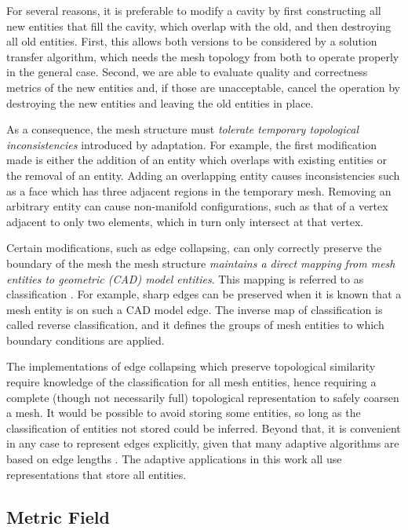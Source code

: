 For several reasons, it is preferable to modify a cavity
by first constructing all new entities that fill the cavity,
which overlap with the old, and then destroying all old entities.
First, this allows both versions to be considered by a solution
transfer algorithm, which needs the mesh topology from both
to operate properly in the general case.
Second, we are able to evaluate quality and correctness metrics
of the new entities and, if those are unacceptable, cancel the
operation by destroying the new entities and leaving
the old entities in place.

As a consequence, the mesh structure must \emph{tolerate temporary
topological inconsistencies} introduced by adaptation.
For example, the first modification made is either the addition
of an entity which overlaps with existing entities
or the removal of an entity.
Adding an overlapping entity causes inconsistencies such as
a face which has three adjacent regions in the temporary mesh.
Removing an arbitrary entity can cause non-manifold configurations,
such as that of a vertex adjacent to only two elements, which
in turn only intersect at that vertex.

Certain modifications, such as edge collapsing, can only correctly
preserve the boundary of the mesh the mesh structure \emph{maintains
a direct mapping from mesh entities to geometric (CAD) model
entities}.
This mapping is referred to as classification \cite{schroeder1990combined}.
For example, sharp edges
can be preserved when it is known that a mesh entity is
on such a CAD model edge.
The inverse map of classification is called reverse
classification, and it defines the groups of mesh entities
to which boundary conditions are applied.

The implementations of edge collapsing which preserve
topological similarity require knowledge
of the classification for all mesh entities,
hence requiring a complete (though not necessarily full)
topological representation \cite{seol2006efficient}
to safely coarsen a mesh.
It would be possible to avoid storing some entities, so long
as the classification of entities not stored could be inferred.
Beyond that, it is convenient in any case to represent
edges explicitly, given that many adaptive algorithms
are based on edge lengths \cite{biswas1998tetrahedral}.
The adaptive applications in this work all use representations
that store all entities.

\subsection{Metric Field}
\label{sec:def_metric}

